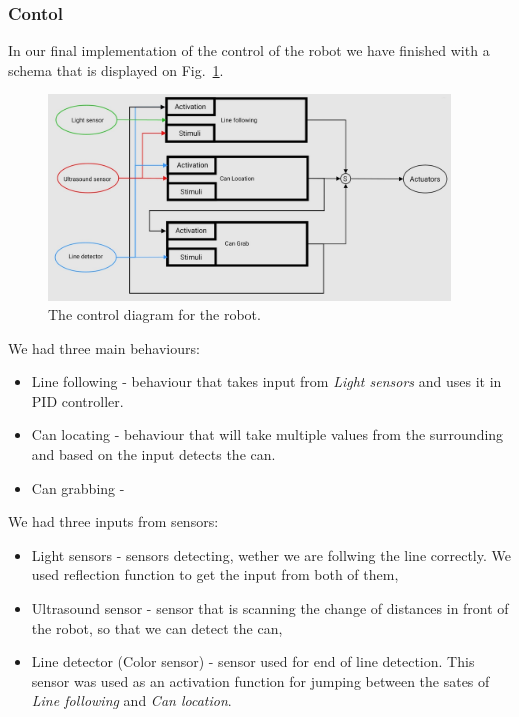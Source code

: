 \documentclass{article}
\begin{document}
\subsubsection{Contol}
\label{subsubsec:control}

In our final implementation of the control of the robot we have finished with a schema that is displayed on
Fig.~\ref{fig:controlDiagram}.

\begin{figure}[hpbt!]
	\begin{center}
		\includegraphics[width=0.95\textwidth]{"./figures/ControlDiagram.jpeg"}
	\end{center}
	\caption{The control diagram for the robot.}
	\label{fig:controlDiagram}
\end{figure}

We had three main behaviours:
\begin{itemize}
	\item Line following - behaviour that takes input from \textit{Light sensors} and uses it in PID controller.
	\item Can locating - behaviour that will take multiple values from the surrounding and based on the input
						 detects the can.
	\item Can grabbing - 
\end{itemize}

We had three inputs from sensors:
\begin{itemize}
	\item Light sensors - sensors detecting, wether we are follwing the line correctly. We used reflection function
		  to get the input from both of them,
	\item Ultrasound sensor - sensor that is scanning the change of distances in front of the robot, so that we can
		  detect the can,
	\item Line detector (Color sensor) - sensor used for end of line detection. This sensor was used as an activation
		  function for jumping between the sates of \textit{Line following} and \textit{Can location}.
\end{itemize}
\end{document}
